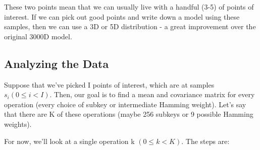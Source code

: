     These two points mean that we can usually live with a handful (3-5) of
    points of interest. If we can pick out good points and write down a model
    using these samples, then we can use a 3D or 5D distribution - a great
    improvement over the original 3000D model.
   \subsection{Analyzing the Data}
    Suppose that we've picked I points of interest, which are at samples $s_i (0
    \le i < I)$. Then, our goal is to find a mean and covariance matrix for
    every operation (every choice of subkey or intermediate Hamming weight).
    Let's say that there are K of these operations (maybe 256 subkeys or 9
    possible Hamming weights).
    
    For now, we'll look at a single operation k $(0 \le k < K)$. The steps are:
